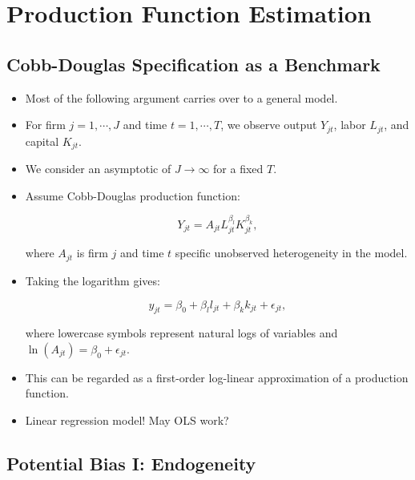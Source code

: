 \documentclass[]{book}
\providecommand{\tightlist}{%
  \setlength{\itemsep}{0pt}\setlength{\parskip}{0pt}}
\theoremstyle{definition}
\theoremstyle{definition}
\theoremstyle{definition}
\theoremstyle{remark}
\begin{document}
\section{Production Function
Estimation}\label{production-function-estimation}

\subsection{Cobb-Douglas Specification as a
Benchmark}\label{cobb-douglas-specification-as-a-benchmark}

\begin{itemize}
\tightlist
\item
  Most of the following argument carries over to a general model.
\item
  For firm \(j = 1, \cdots, J\) and time \(t = 1, \cdots, T\), we
  observe output \(Y_{jt}\), labor \(L_{jt}\), and capital \(K_{jt}\).
\item
  We consider an asymptotic of \(J \to \infty\) for a fixed \(T\).
\item
  Assume Cobb-Douglas production function:

  \begin{equation}
  Y_{jt} = A_{jt}  L_{jt}^{\beta_l} K_{jt}^{\beta_k},
  \end{equation}

  where \(A_{jt}\) is firm \(j\) and time \(t\) specific unobserved
  heterogeneity in the model.
\item
  Taking the logarithm gives:

  \begin{equation}
  y_{jt} = \beta_0 + \beta_l l_{jt} + \beta_k k_{jt} + \epsilon_{jt},
  \end{equation}

  where lowercase symbols represent natural logs of variables and
  \(\ln(A_{jt}) = \beta_0 + \epsilon_{jt}\).
\item
  This can be regarded as a first-order log-linear approximation of a
  production function.
\item
  Linear regression model! May OLS work?
\end{itemize}

\subsection{Potential Bias I:
Endogeneity}\label{potential-bias-i-endogeneity}
\end{document}
